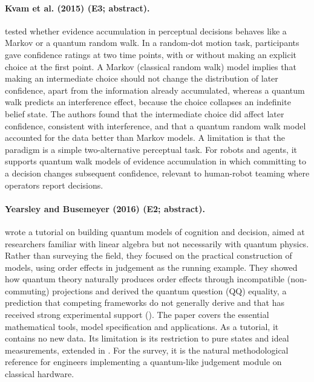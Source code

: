 \documentclass[10pt,a4paper]{article}
\begin{document}
\paragraph{Kvam et al. (2015) (E3; abstract).} \citet{Kvam2015} tested whether evidence accumulation in perceptual decisions behaves like a Markov or a quantum random walk. In a random-dot motion task, participants gave confidence ratings at two time points, with or without making an explicit choice at the first point. A Markov (classical random walk) model implies that making an intermediate choice should not change the distribution of later confidence, apart from the information already accumulated, whereas a quantum walk predicts an interference effect, because the choice collapses an indefinite belief state. The authors found that the intermediate choice did affect later confidence, consistent with interference, and that a quantum random walk model accounted for the data better than Markov models. A limitation is that the paradigm is a simple two-alternative perceptual task. For robots and agents, it supports quantum walk models of evidence accumulation in which committing to a decision changes subsequent confidence, relevant to human-robot teaming where operators report decisions.

\paragraph{Yearsley and Busemeyer (2016) (E2; abstract).} \citet{Yearsley2016a} wrote a tutorial on building quantum models of cognition and decision, aimed at researchers familiar with linear algebra but not necessarily with quantum physics. Rather than surveying the field, they focused on the practical construction of models, using order effects in judgement as the running example. They showed how quantum theory naturally produces order effects through incompatible (non-commuting) projections and derived the quantum question (QQ) equality, a prediction that competing frameworks do not generally derive and that has received strong experimental support (\citep{Wang2014}). The paper covers the essential mathematical tools, model specification and applications. As a tutorial, it contains no new data. Its limitation is its restriction to pure states and ideal measurements, extended in \citep{Yearsley2017}. For the survey, it is the natural methodological reference for engineers implementing a quantum-like judgement module on classical hardware.
\end{document}
